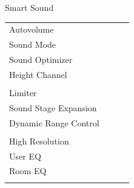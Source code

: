 \documentclass{beamer}
\begin{document}
\begin{frame}[t]{Smart Sound}
\begin{tiny}
\begin{tabular}{@{}lccc@{}}
				Autovolume & \color{black}{Off} & & \\
				Sound Mode & \color{black}{Off} & & \\
				Sound Optimizer & \color{black}{Off} & & \\
				Height Channel & \color{black}{Off} & & \\
				\color{blue}{Automatic Scene Classificiation} & \color{blue}{On} & & \\
				Limiter & \color{black}{Off} & & \\
				\color{blue}Sound Stage Expansion & \color{blue}{On} & & \\
				Dynamic Range Control & \color{black}{Off} & & \\
				\color{blue}{Smart Sound Controller} & \color{blue}{On} & & \\
				High Resolution & \color{black}{Off} & & \\
				User EQ & \color{black}{Off} & & \\
				Room EQ & \color{black}{Off} & & \\
				\color{blue}{OSD Volume} & \color{blue}{On} &  \color{blue}{Vol.40} & \\
				\midrule
			\end{tabular}
		\end{tiny}
		
	\end{frame}
	
\end{document}
